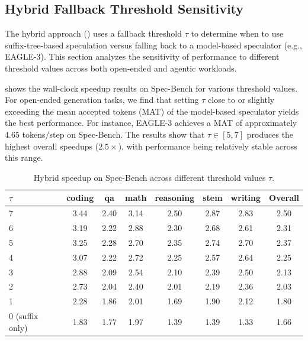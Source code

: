 \subsection{Hybrid Fallback Threshold Sensitivity}
\label{suffixdecoding:sec:threshold-sensitivity}

The hybrid \SuffixDecoding approach () uses a fallback threshold $\tau$ to determine when to use suffix-tree-based speculation versus falling back to a model-based speculator (e.g., EAGLE-3). This section analyzes the sensitivity of performance to different threshold values across both open-ended and agentic workloads.

 shows the wall-clock speedup results on Spec-Bench for various threshold values. For open-ended generation tasks, we find that setting $\tau$ close to or slightly exceeding the mean accepted tokens (MAT) of the model-based speculator yields the best performance. For instance, EAGLE-3 achieves a MAT of approximately 4.65 tokens/step on Spec-Bench. The results show that $\tau \in [5, 7]$ produces the highest overall speedups ($2.5\times$), with performance being relatively stable across this range.

\begin{table}[htbp]
\centering
\caption{Hybrid \SuffixDecoding speedup on Spec-Bench across different threshold values $\tau$.}
\label{suffixdecoding:tab:threshold-specbench}
\small
\begin{tabular}{lccccccc}
\toprule
$\tau$ & coding & qa & math & reasoning & stem & writing & Overall \\
\midrule
7 & 3.44 & 2.40 & 3.14 & 2.50 & 2.87 & 2.83 & 2.50 \\
6 & 3.19 & 2.22 & 2.88 & 2.30 & 2.68 & 2.61 & 2.31 \\
5 & 3.25 & 2.28 & 2.70 & 2.35 & 2.74 & 2.70 & 2.37 \\
4 & 3.07 & 2.22 & 2.72 & 2.25 & 2.57 & 2.64 & 2.25 \\
3 & 2.88 & 2.09 & 2.54 & 2.10 & 2.39 & 2.50 & 2.13 \\
2 & 2.73 & 2.04 & 2.40 & 2.01 & 2.19 & 2.36 & 2.03 \\
1 & 2.28 & 1.86 & 2.01 & 1.69 & 1.90 & 2.12 & 1.80 \\
0 (suffix only) & 1.83 & 1.77 & 1.97 & 1.39 & 1.39 & 1.33 & 1.66 \\
\bottomrule
\end{tabular}
\end{table}

